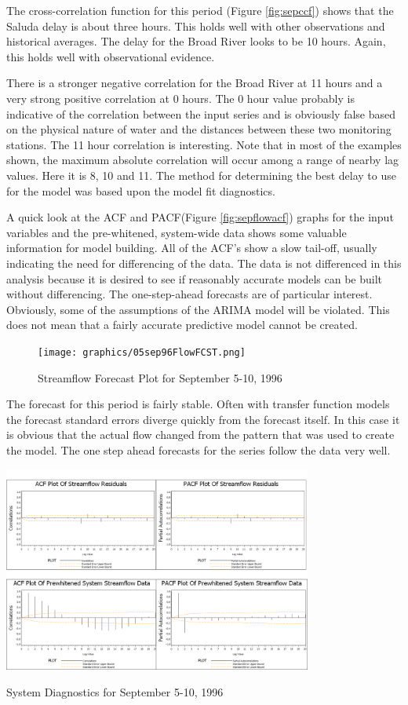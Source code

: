 \documentclass[12pt]{report}
\begin{document}
The cross-correlation function for this period (Figure
\ref{fig:sepccf}) shows that the Saluda delay is about three
hours.  This holds well with other observations and historical
averages.  The delay for the Broad River looks to be 10 hours.
Again, this holds well with observational evidence.

There is a stronger negative correlation for the Broad River at 11
hours and a very strong positive correlation at 0 hours.  The 0
hour value probably is indicative of the correlation between the
input series and is obviously false based on the physical nature
of water and the distances between these two monitoring stations.
The 11 hour correlation is interesting. Note that in most of the
examples shown, the maximum absolute correlation will occur among
a range of nearby lag values.  Here it is 8, 10 and 11.  The
method for determining the best delay to use for the model was
based upon the model fit diagnostics.


A quick look at the ACF and PACF(Figure \ref{fig:sepflowacf})
graphs for the input variables and the pre-whitened, system-wide
data shows some valuable information for model building.  All of
the ACF's show a slow tail-off, usually indicating the need for
differencing of the data.  The data is not differenced in this
analysis because it is desired to see if reasonably accurate
models can be built without differencing.  The one-step-ahead
forecasts are of particular interest.  Obviously, some of the
assumptions of the ARIMA model will be violated.  This does not
mean that a fairly accurate predictive model cannot be created.


\begin{figure}[h]
\centering\texttt{[image: graphics/05sep96FlowFCST.png]}
\centering\caption{Streamflow Forecast Plot for September 5-10,
1996}
\end{figure}

The forecast for this period is fairly stable.  Often with
transfer function models the forecast standard errors diverge
quickly from the forecast itself.  In this case it is obvious that
the actual flow changed from the pattern that was used to create
the model.  The one step ahead forecasts for the series follow the
data very well.

\begin{table}[h]
\centering\includegraphics[width=4in]{prodgraph/05sepresid.png}
\centering\caption{System  Diagnostics for September 5-10,
1996}\label{fig:resacf12}
\end{table}
\end{document}
